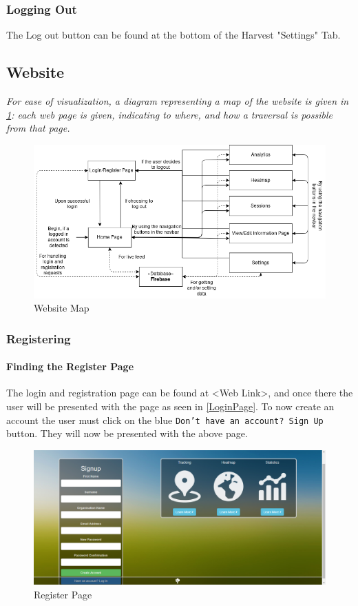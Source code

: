 \documentclass[11pt]{article}
\begin{document}
\subsubsection{Logging Out}
The Log out button can be found at the bottom of the Harvest "Settings" Tab.

\subsection{Website}



\textit{For ease of visualization, a diagram representing a map of the website is given in \ref{WebsiteMap}: each web page is given, indicating to where, and how a traversal is possible from that page.}

\begin{figure}[h]
 \centering
 \includegraphics[width=12cm, keepaspectratio]{Images/webDiagramMap.png}
 \caption{Website Map}
 \label{WebsiteMap}
\end{figure}

\subsubsection{Registering}
\paragraph{Finding the Register Page}The login and registration page can be found at <Web Link>, and once there the user will be presented with the page as seen in \ref{LoginPage}. To now create an account the user must click on the blue \texttt{Don't have an account? Sign Up} button. They will now be presented with the above page.

\begin{figure}
 \centering
 \includegraphics[width=12cm, keepaspectratio]{Images/webRegister-Page.png}
 \caption{Register Page}
 \label{RegisterPage}
\end{figure}
\end{document}
